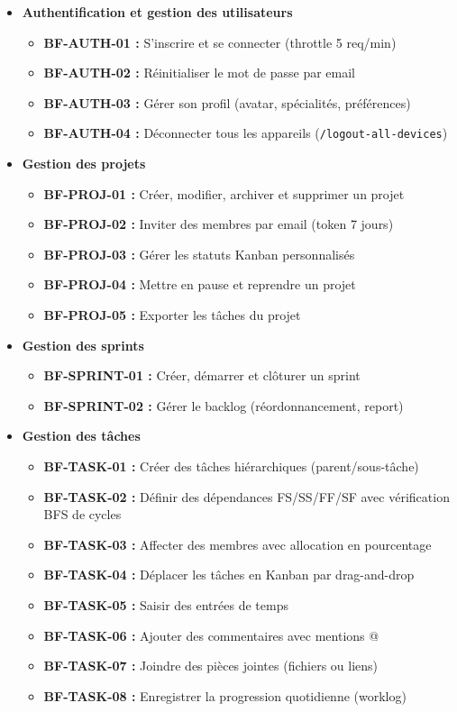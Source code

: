 \begin{itemize}

  \item \textbf{Authentification et gestion des utilisateurs}
  \begin{itemize}
    \item \textbf{BF-AUTH-01 :} S'inscrire et se connecter (throttle 5 req/min)
    \item \textbf{BF-AUTH-02 :} Réinitialiser le mot de passe par email
    \item \textbf{BF-AUTH-03 :} Gérer son profil (avatar, spécialités, préférences)
    \item \textbf{BF-AUTH-04 :} Déconnecter tous les appareils (\texttt{/logout-all-devices})
  \end{itemize}

  \item \textbf{Gestion des projets}
  \begin{itemize}
    \item \textbf{BF-PROJ-01 :} Créer, modifier, archiver et supprimer un projet
    \item \textbf{BF-PROJ-02 :} Inviter des membres par email (token 7 jours)
    \item \textbf{BF-PROJ-03 :} Gérer les statuts Kanban personnalisés
    \item \textbf{BF-PROJ-04 :} Mettre en pause et reprendre un projet
    \item \textbf{BF-PROJ-05 :} Exporter les tâches du projet
  \end{itemize}

  \item \textbf{Gestion des sprints}
  \begin{itemize}
    \item \textbf{BF-SPRINT-01 :} Créer, démarrer et clôturer un sprint
    \item \textbf{BF-SPRINT-02 :} Gérer le backlog (réordonnancement, report)
  \end{itemize}

  \item \textbf{Gestion des tâches}
  \begin{itemize}
    \item \textbf{BF-TASK-01 :} Créer des tâches hiérarchiques (parent/sous-tâche)
    \item \textbf{BF-TASK-02 :} Définir des dépendances FS/SS/FF/SF avec
          vérification BFS de cycles
    \item \textbf{BF-TASK-03 :} Affecter des membres avec allocation en pourcentage
    \item \textbf{BF-TASK-04 :} Déplacer les tâches en Kanban par drag-and-drop
    \item \textbf{BF-TASK-05 :} Saisir des entrées de temps
    \item \textbf{BF-TASK-06 :} Ajouter des commentaires avec mentions @
    \item \textbf{BF-TASK-07 :} Joindre des pièces jointes (fichiers ou liens)
    \item \textbf{BF-TASK-08 :} Enregistrer la progression quotidienne (worklog)
  \end{itemize}


\end{itemize}
